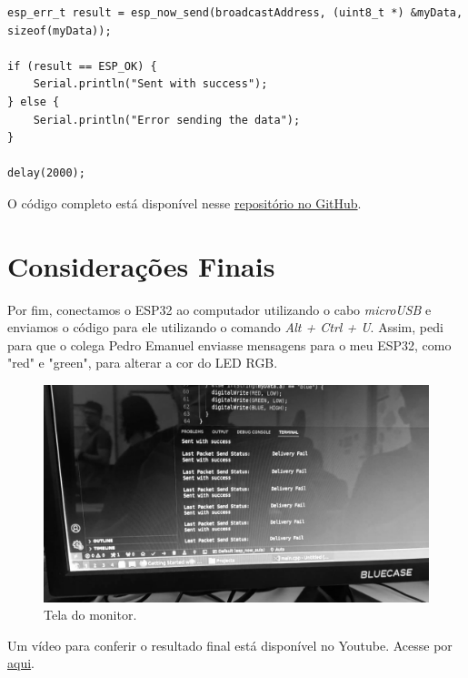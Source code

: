 \documentclass[12pt]{article}
\begin{document}
\begin{lstlisting}
esp_err_t result = esp_now_send(broadcastAddress, (uint8_t *) &myData, sizeof(myData));

if (result == ESP_OK) {
    Serial.println("Sent with success");
} else {
    Serial.println("Error sending the data");
}

delay(2000);
\end{lstlisting}

O código completo está disponível nesse \href{https://github.com/fabricio-araujo94/microcontroladores/tree/main/esp_now_}{repositório no GitHub}.

\section{Considerações Finais}

Por fim, conectamos o ESP32 ao computador utilizando o cabo \textit{microUSB} e enviamos o código para ele utilizando o comando \textit{Alt + Ctrl + U}. Assim, pedi para que o colega Pedro Emanuel enviasse mensagens para o meu ESP32, como "red" e "green", para alterar a cor do LED RGB.

\begin{figure}[H]
    \centering
    \includegraphics[width=0.5\linewidth]{img/20241202_091748.mp4_snapshot_00.08.622.jpg}
    \caption{Tela do monitor.}
    \label{fig:monitor}
\end{figure}

Um vídeo para conferir o resultado final está disponível no Youtube. Acesse por \href{https://youtu.be/Sk7I_T_a9ao}{aqui}.
\end{document}
